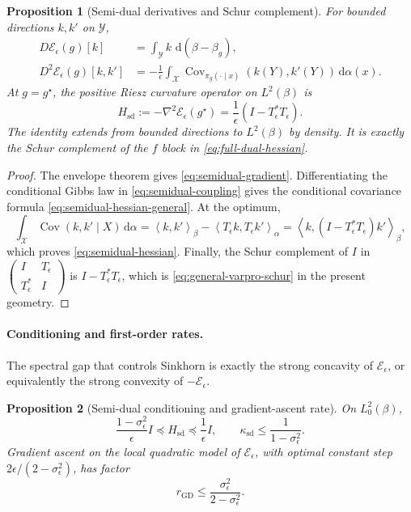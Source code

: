 \documentclass[11pt]{article}
\newtheorem{proposition}{Proposition}[section]
\theoremstyle{definition}
\theoremstyle{remark}
\newcommand{\eps}{\epsilon}
\newcommand{\al}{\alpha}
\newcommand{\be}{\beta}
\newcommand{\Xx}{\mathcal{X}}
\newcommand{\Yy}{\mathcal{Y}}
\newcommand{\Ee}{\mathcal{E}}
\newcommand{\dd}{\,\mathrm{d}}
\newcommand{\ip}[2]{\left\langle #1,#2\right\rangle}
\DeclareMathOperator{\Cov}{Cov}
\begin{document}
\begin{proposition}[Semi-dual derivatives and Schur complement]
  \label{prop:semidual-varpro}
  For bounded directions $k,k'$ on $\Yy$,
  \begin{align}
    D\Ee_\eps(g)[k]
    &=
    \int_{\Yy} k\,\dd(\be-\be_g),
    \label{eq:semidual-gradient}
    \\
    D^2\Ee_\eps(g)[k,k']
    &=
    -\frac1\eps
    \int_{\Xx}
    \Cov_{\pi_g(\cdot\mid x)}(k(Y),k'(Y))\dd\al(x).
    \label{eq:semidual-hessian-general}
  \end{align}
  At $g=g^\star$, the positive Riesz curvature operator on $L^2(\be)$ is
  \begin{equation}
    \label{eq:semidual-hessian}
    H_{\mathrm{sd}}
    :=
    -\nabla^2\Ee_\eps(g^\star)
    =
    \frac1\eps(I-T_\eps^\ast T_\eps).
  \end{equation}
  The identity extends from bounded directions to $L^2(\be)$ by
  density.
  It is exactly the Schur complement of the $f$ block in
  \eqref{eq:full-dual-hessian}.
\end{proposition}

\begin{proof}
The envelope theorem gives \eqref{eq:semidual-gradient}. Differentiating
the conditional Gibbs law in \eqref{eq:semidual-coupling} gives the
conditional covariance formula \eqref{eq:semidual-hessian-general}.
At the optimum,
\[
  \int_{\Xx}\Cov(k,k'\mid X)\dd\al
  =
  \ip{k}{k'}_\be-\ip{T_\eps k}{T_\eps k'}_\al
  =
  \ip{k}{(I-T_\eps^\ast T_\eps)k'}_\be,
\]
which proves \eqref{eq:semidual-hessian}. Finally, the Schur complement
of $I$ in
$\left(\begin{smallmatrix}I&T_\eps\\T_\eps^\ast&I\end{smallmatrix}\right)$ is
$I-T_\eps^\ast T_\eps$, which is
\eqref{eq:general-varpro-schur} in the present geometry.
\end{proof}

\paragraph{Conditioning and first-order rates.}
The spectral gap that controls Sinkhorn is exactly the strong concavity
of $\Ee_\eps$, or equivalently the strong convexity of $-\Ee_\eps$.

\begin{proposition}[Semi-dual conditioning and gradient-ascent rate]
  \label{prop:semidual-conditioning}
  On $L_0^2(\be)$,
  \begin{equation}
    \label{eq:semidual-curvature}
    \frac{1-\sigma_\eps^2}{\eps} I
    \preceq
    H_{\mathrm{sd}}
    \preceq
    \frac1\eps I,
    \qquad
    \kappa_{\mathrm{sd}}
    \leq
    \frac1{1-\sigma_\eps^2}.
  \end{equation}
  Gradient ascent on the local quadratic model of $\Ee_\eps$, with
  optimal constant step $2\eps/(2-\sigma_\eps^2)$, has factor
  \begin{equation}
    \label{eq:semidual-gradient-rate}
    r_{\mathrm{GD}}
    \leq
    \frac{\sigma_\eps^2}{2-\sigma_\eps^2}.
  \end{equation}
\end{proposition}
\end{document}
